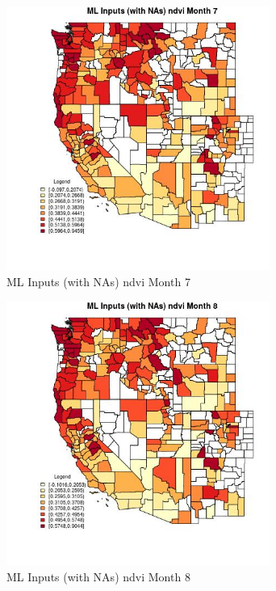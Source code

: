 \begin{figure} 
\centering  
\includegraphics[width=0.77\textwidth]{Code_Outputs/Report_ML_input_PM25_Step4_part_e_de_duplicated_aves_compiled_2019-05-21wNAs_CountyndvimedianMonth7.jpg} 
\caption{\label{fig:Report_ML_input_PM25_Step4_part_e_de_duplicated_aves_compiled_2019-05-21wNAsCountyndvimedianMonth7}ML Inputs (with NAs) ndvi Month 7} 
\end{figure} 
 

\begin{figure} 
\centering  
\includegraphics[width=0.77\textwidth]{Code_Outputs/Report_ML_input_PM25_Step4_part_e_de_duplicated_aves_compiled_2019-05-21wNAs_CountyndvimedianMonth8.jpg} 
\caption{\label{fig:Report_ML_input_PM25_Step4_part_e_de_duplicated_aves_compiled_2019-05-21wNAsCountyndvimedianMonth8}ML Inputs (with NAs) ndvi Month 8} 
\end{figure} 
 

